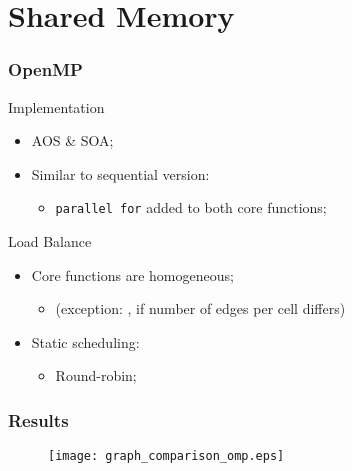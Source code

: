 \section{Shared Memory}


\begin{frame}
	\frametitle{OpenMP}
	\begin{block}{Implementation}
		\begin{itemize}
			\item AOS \& SOA;
			\item Similar to sequential version:
			\begin{itemize}
				\item \texttt{parallel for} added to both core functions;
			\end{itemize}
		\end{itemize}
	\end{block}
	\pause
	\begin{block}{Load Balance}
		\begin{itemize}
			\item Core functions are homogeneous;
			\begin{itemize}
				\item [] (exception: \update, if number of edges per cell differs)
			\end{itemize}
			\item Static scheduling:
			\begin{itemize}
				\item Round-robin;
			\end{itemize}
		\end{itemize}
	\end{block}
\end{frame}

\begin{frame}
	\frametitle{Results}
	\begin{figure}
		\centering
		\texttt{[image: graph\_comparison\_omp.eps]}
	\end{figure}
\end{frame}

